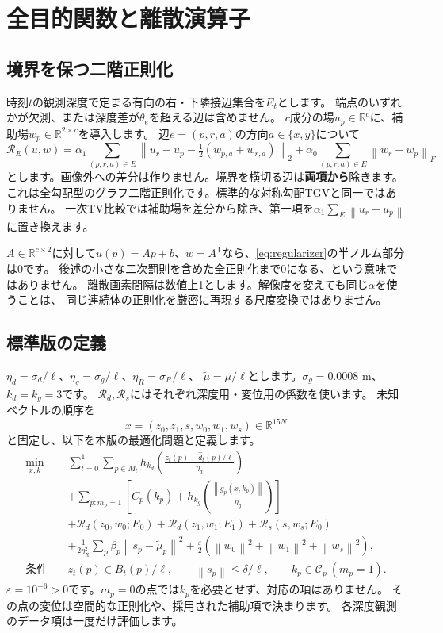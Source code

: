 \documentclass[a4paper,11pt]{ltjsarticle}
\newcommand{\R}{\mathbb R}\newcommand{\T}{\mathsf T}\newcommand{\norm}[1]{\left\lVert#1\right\rVert}
\newcommand{\Reg}{\mathcal R}\newcommand{\NA}{---}\newcommand{\code}[1]{\texttt{\detokenize{#1}}}
\theoremstyle{definition}
\begin{document}
\section{全目的関数と離散演算子}
\subsection{境界を保つ二階正則化}
時刻$t$の観測深度で定まる有向の右・下隣接辺集合を$E_t$とします。
端点のいずれかが欠測、または深度差が$\theta_e$を超える辺は含めません。
$c$成分の場$u_p\in\R^c$に、補助場$w_p\in\R^{2\times c}$を導入します。
辺$e=(p,r,a)$の方向$a\in\{x,y\}$について
\begin{equation}\label{eq:regularizer}
\Reg_E(u,w)=\alpha_1\sum_{(p,r,a)\in E}
 \norm{u_r-u_p-\tfrac12(w_{p,a}+w_{r,a})}_2
 +\alpha_0\sum_{(p,r,a)\in E}\norm{w_r-w_p}_F
\end{equation}
とします。画像外への差分は作りません。境界を横切る辺は\textbf{両項から}除きます。
これは全勾配型のグラフ二階正則化です。標準的な対称勾配TGVと同一ではありません。
一次TV比較では補助場を差分から除き、第一項を$\alpha_1\sum_E\norm{u_r-u_p}$に置き換えます。

$A\in\R^{c\times2}$に対して$u(p)=Ap+b$、$w=A^\T$なら、\eqref{eq:regularizer}の半ノルム部分は0です。
後述の小さな二次罰則を含めた全正則化まで0になる、という意味ではありません。
離散画素間隔は数値上1とします。解像度を変えても同じ$\alpha$を使うことは、
同じ連続体の正則化を厳密に再現する尺度変換ではありません。

\subsection{標準版の定義}
$\eta_d=\sigma_d/\ell$、$\eta_g=\sigma_g/\ell$、$\eta_R=\sigma_R/\ell$、
$\widetilde\mu=\mu/\ell$とします。$\sigma_g=0.0008$ m、$k_d=k_g=3$です。
$\Reg_d,\Reg_s$にはそれぞれ深度用・変位用の係数を使います。
未知ベクトルの順序を
\[
x=(z_0,z_1,s,w_0,w_1,w_s)\in\R^{15N}
\]
と固定し、以下を本版の最適化問題と定義します。
\begin{equation}\label{eq:objective}
\begin{split}
\min_{x,k}\quad &
 \sum_{t=0}^{1}\sum_{p\in M_t}
 h_{k_d}\!\left(\frac{z_t(p)-\widehat d_t(p)/\ell}{\eta_d}\right)\\
 &+\sum_{p:m_p=1}\left[C_p(k_p)+
 h_{k_g}\!\left(\frac{\norm{g_p(x,k_p)}}{\eta_g}\right)\right]\\
 &+\Reg_d(z_0,w_0;E_0)+\Reg_d(z_1,w_1;E_1)
    +\Reg_s(s,w_s;E_0)\\
 &+\frac{1}{2\eta_R^2}\sum_p\beta_p\norm{s_p-\widetilde\mu_p}^2
   +\frac{\varepsilon}{2}\left(\norm{w_0}^2+\norm{w_1}^2+\norm{w_s}^2\right),\\
\text{条件}\quad & z_t(p)\in B_t(p)/\ell,\qquad
 \norm{s_p}\le\delta/\ell,\qquad k_p\in\mathcal C_p\ (m_p=1).
\end{split}
\end{equation}
$\varepsilon=10^{-6}>0$です。$m_p=0$の点では$k_p$を必要とせず、対応の項はありません。
その点の変位は空間的な正則化や、採用された補助項で決まります。
各深度観測のデータ項は一度だけ評価します。
\end{document}
